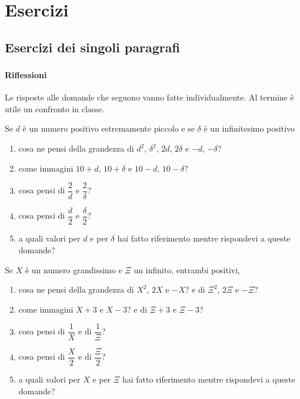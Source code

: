 

\section{Esercizi}
\subsection{Esercizi dei singoli paragrafi}

\subsubsection*{}

\paragraph{Riflessioni}
Le risposte alle domande che seguono vanno fatte individualmente. Al termine è 
utile un confronto in classe.
\begin{esercizio}
Se \(d\) è un numero positivo estremamente piccolo e se \(\delta\) è un 
infinitesimo positivo
\begin{enumerate} [noitemsep]
\item  cosa ne pensi della grandezza di \(d^2\), \(\delta^2\), \(2d\), \(2\delta\) e 
\(-d\), \(-\delta\)?
\item come immagini \(10+d\), \(10+\delta\) e \(10-d\), \(10-\delta\)?
\item cosa pensi di \(\dfrac{2}{d}\) e \(\dfrac{2}{\delta}\)?
\item cosa pensi di \(\dfrac{d}{2}\) e \(\dfrac{\delta}{2}\)?
\item a quali valori per \(d\) e per \(\delta\) hai fatto riferimento mentre
 rispondevi a queste domande?
\end{enumerate}
\end{esercizio}

\begin{esercizio}
Se \(X\) è un numero grandissimo e \(\Xi\) un infinito, entrambi positivi,
\begin{enumerate} [noitemsep]
\item cosa ne pensi della grandezza di \(X^2\), \(2X\) e \(-X\)? e di \(\Xi^2\), \(2\Xi\)
e \(-\Xi\)?
\item come immagini \(X+3\) e \(X-3\)? e di \(\Xi+3\) e \(\Xi-3\)?
\item cosa pensi di \(\dfrac{1}{X}\) e di \(\dfrac{1}{\Xi}\)?
\item cosa pensi di \(\dfrac{X}{2}\) e di \(\dfrac{\Xi}{2}\)?
\item a quali valori per \(X\) e per \(\Xi\) hai fatto riferimento mentre
 rispondevi a queste domande?
 \end{enumerate}
\end{esercizio}

